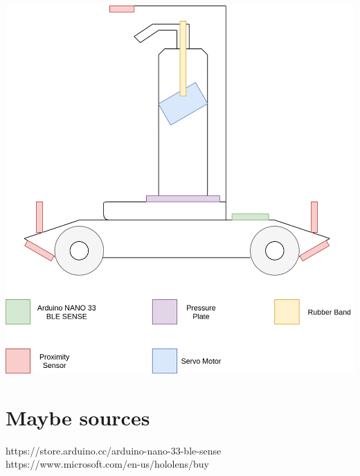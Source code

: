 \documentclass{article}
\begin{document}
\includegraphics[width=\linewidth]{img/prototype-drawing.png}

\section{Maybe sources}

https://store.arduino.cc/arduino-nano-33-ble-sense\\
https://www.microsoft.com/en-us/hololens/buy
\end{document}
